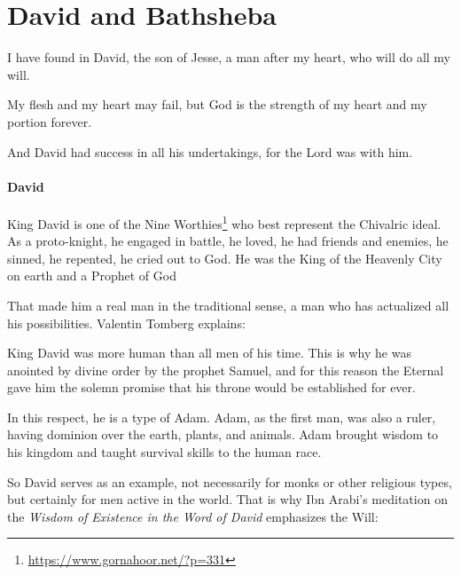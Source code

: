 \section{David and Bathsheba}

\begin{quotex}
I have found in David, the son of Jesse, a man after my heart, who will do all my will. 

\vspace{-1.5em}



My flesh and my heart may fail, but God is the strength of my heart and my portion forever. 

\vspace{-1.5em}


And David had success in all his undertakings, for the Lord was with him. 

\vspace{-1.5em}


\end{quotex}
\paragraph{David}
King David is one of the Nine Worthies\footnote{\url{https://www.gornahoor.net/?p=331}} who best represent the Chivalric ideal. As a proto-knight, he engaged in battle, he loved, he had friends and enemies, he sinned, he repented, he cried out to God. He was the King of the Heavenly City on earth and a Prophet of God

That made him a real man in the traditional sense, a man who has actualized all his possibilities. Valentin Tomberg explains:

\begin{quotex}
King David was more human than all men of his time. This is why he was anointed by divine order by the prophet Samuel, and for this reason the Eternal gave him the solemn promise that his throne would be established for ever.

\end{quotex}
In this respect, he is a type of Adam. Adam, as the first man, was also a ruler, having dominion over the earth, plants, and animals. Adam brought wisdom to his kingdom and taught survival skills to the human race.

So David serves as an example, not necessarily for monks or other religious types, but certainly for men active in the world. That is why Ibn Arabi's meditation on the \emph{Wisdom of Existence in the Word of David} emphasizes the Will:

